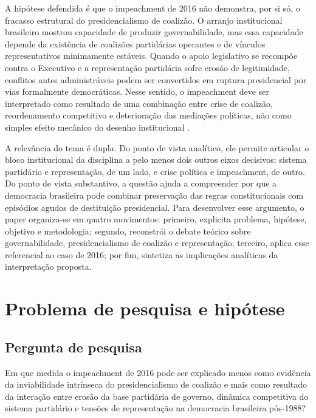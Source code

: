 \documentclass[12pt,a4paper]{article}
\begin{document}
A hipótese defendida é que o impeachment de 2016 não demonstra, por si só, o fracasso estrutural do presidencialismo de coalizão. O arranjo institucional brasileiro mostrou capacidade de produzir governabilidade, mas essa capacidade depende da existência de coalizões partidárias operantes e de vínculos representativos minimamente estáveis. Quando o apoio legislativo se recompõe contra o Executivo e a representação partidária sofre erosão de legitimidade, conflitos antes administráveis podem ser convertidos em ruptura presidencial por vias formalmente democráticas. Nesse sentido, o impeachment deve ser interpretado como resultado de uma combinação entre crise de coalizão, reordenamento competitivo e deterioração das mediações políticas, não como simples efeito mecânico do desenho institucional \textcite{limongi2017_a_crise} \textcite{perez_lian2016_explaining_military}.

A relevância do tema é dupla. Do ponto de vista analítico, ele permite articular o bloco institucional da disciplina a pelo menos dois outros eixos decisivos: sistema partidário e representação, de um lado, e crise política e impeachment, de outro. Do ponto de vista substantivo, a questão ajuda a compreender por que a democracia brasileira pode combinar preservação das regras constitucionais com episódios agudos de destituição presidencial. Para desenvolver esse argumento, o paper organiza-se em quatro movimentos: primeiro, explicita problema, hipótese, objetivo e metodologia; segundo, reconstrói o debate teórico sobre governabilidade, presidencialismo de coalizão e representação; terceiro, aplica esse referencial ao caso de 2016; por fim, sintetiza as implicações analíticas da interpretação proposta.

\section{Problema de pesquisa e hipótese}
\label{sec:org66be366}
\subsection{Pergunta de pesquisa}
\label{sec:org5e7b481}
Em que medida o impeachment de 2016 pode ser explicado menos como evidência da inviabilidade intrínseca do presidencialismo de coalizão e mais como resultado da interação entre erosão da base partidária de governo, dinâmica competitiva do sistema partidário e tensões de representação na democracia brasileira pós-1988?
\end{document}
